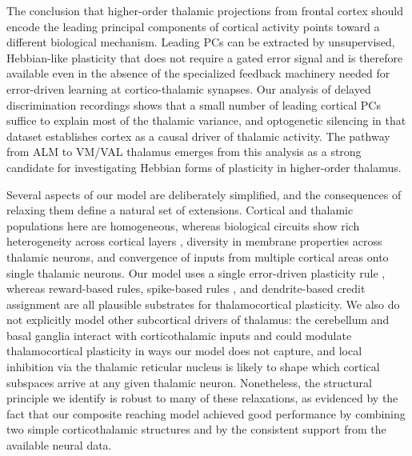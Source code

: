 \documentclass[11pt]{article}
\begin{document}
The conclusion that higher-order thalamic projections from frontal
cortex should encode the leading principal components of cortical
activity points toward a different biological mechanism. Leading PCs
can be extracted by unsupervised, Hebbian-like plasticity that does
not require a gated error signal and is therefore available even in
the absence of the specialized feedback machinery needed for
error-driven learning at cortico-thalamic synapses. Our analysis of
delayed discrimination recordings \cite{guo2017maintenance} shows that
a small number of leading cortical PCs suffice to explain most of the
thalamic variance, and optogenetic silencing in that dataset
establishes cortex as a causal driver of thalamic activity. The
pathway from ALM to VM/VAL thalamus
\cite{guo2018anterolateral, collins2018reciprocal} emerges from this
analysis as a strong candidate for investigating Hebbian forms of
plasticity in higher-order thalamus.

Several aspects of our model are deliberately simplified, and the
consequences of relaxing them define a natural set of extensions.
Cortical and thalamic populations here are homogeneous, whereas
biological circuits show rich heterogeneity across cortical layers
\cite{economo2018distinct, guo2018anterolateral}, diversity in
membrane properties across thalamic neurons, and convergence of inputs
from multiple cortical areas onto single thalamic neurons. Our model
uses a single error-driven plasticity rule \cite{murray2019local},
whereas reward-based rules, spike-based rules
\cite{gilra2017predicting}, and dendrite-based credit assignment
\cite{guerguiev2017towards, bittner2017behavioral} are all plausible
substrates for thalamocortical plasticity. We also do not explicitly
model other subcortical drivers of thalamus: the cerebellum and basal
ganglia interact with corticothalamic inputs and could modulate
thalamocortical plasticity in ways our model does not capture, and
local inhibition via the thalamic reticular nucleus is likely to shape
which cortical subspaces arrive at any given thalamic neuron.
Nonetheless, the structural principle we identify is robust to many of
these relaxations, as evidenced by the fact that our composite
reaching model achieved good performance by combining two simple
corticothalamic structures and by the consistent support from the
available neural data.
\end{document}
